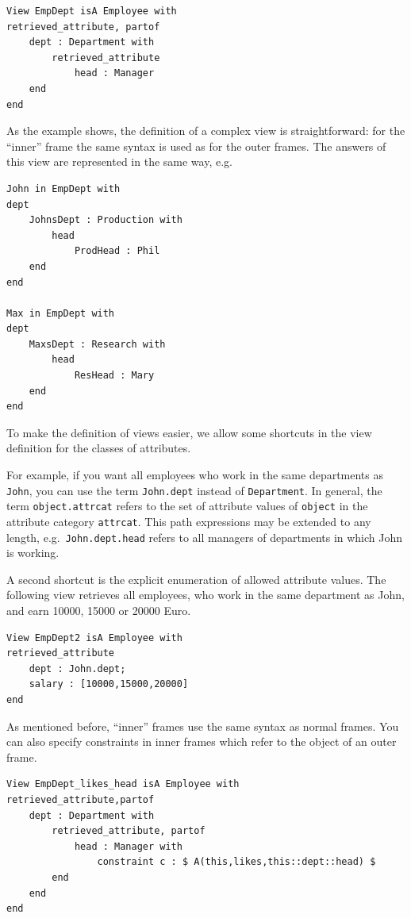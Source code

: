 {\small
\begin{verbatim}
View EmpDept isA Employee with
retrieved_attribute, partof
    dept : Department with
        retrieved_attribute
            head : Manager
    end
end
\end{verbatim}
}

As the example shows, the definition of a complex view is straightforward:
for the ``inner'' frame the same syntax is used as for the outer frames.
The answers of this view are represented in the same way, e.g.

{\small
\begin{verbatim}
John in EmpDept with
dept
    JohnsDept : Production with
        head
            ProdHead : Phil
    end
end

Max in EmpDept with
dept
    MaxsDept : Research with
        head
            ResHead : Mary
    end
end
\end{verbatim}
}

To make the definition of views easier, we allow some shortcuts
in the view definition for the classes of attributes.

For example, if you want all employees who work in the same
departments as {\tt John}, you can use the term \verb+John.dept+
instead of {\tt Department}. In general, the term \verb+object.attrcat+
refers to the set of attribute values of {\tt object} in the attribute
category {\tt attrcat}. This path expressions may be extended to
any length, e.g.\ \verb+John.dept.head+ refers to all managers of
departments in which John is working.

A second shortcut is the explicit enumeration of allowed attribute
values. The following view retrieves all employees, who work
in the same department as John, and earn 10000, 15000 or 20000 Euro.

{\small
\begin{verbatim}
View EmpDept2 isA Employee with
retrieved_attribute
    dept : John.dept;
    salary : [10000,15000,20000]
end
\end{verbatim}
}


As mentioned before, ``inner'' frames use the same syntax as normal
frames. You can also specify constraints in inner frames which
refer to the object of an outer frame.

{\small
\begin{verbatim}
View EmpDept_likes_head isA Employee with
retrieved_attribute,partof
    dept : Department with
        retrieved_attribute, partof
            head : Manager with
                constraint c : $ A(this,likes,this::dept::head) $
        end
    end
end
\end{verbatim}
}

